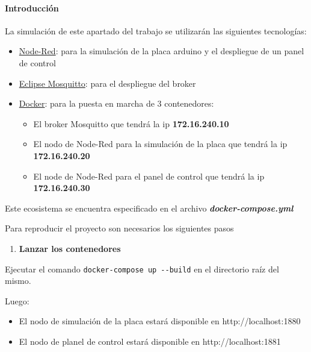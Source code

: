 \documentclass[11pt]{article}
\providecommand{\tightlist}{%
      \setlength{\itemsep}{0pt}\setlength{\parskip}{0pt}}
\begin{document}
    \hypertarget{introducciuxf3n}{%
\paragraph{Introducción}\label{introducciuxf3n}}

La simulación de este apartado del trabajo se utilizarán las siguientes
tecnologías:

\begin{itemize}
\item
  \href{https://nodered.org/}{Node-Red}: para la simulación de la placa
  arduino y el despliegue de un panel de control
\item
  \href{https://mosquitto.org/}{Eclipse Mosquitto}: para el despliegue
  del broker
\item
  \href{https://www.docker.com/}{Docker}: para la puesta en marcha de 3
  contenedores:

  \begin{itemize}
  \item
    El broker Mosquitto que tendrá la ip \textbf{172.16.240.10}
  \item
    El nodo de Node-Red para la simulación de la placa que tendrá la ip
    \textbf{172.16.240.20}
  \item
    El node de Node-Red para el panel de control que tendrá la ip
    \textbf{172.16.240.30}
  \end{itemize}
\end{itemize}

Este ecosistema se encuentra especificado en el archivo
\textbf{\emph{docker-compose.yml}}

Para reproducir el proyecto son necesarios los siguientes pasos

\begin{enumerate}
\def\labelenumi{\arabic{enumi})}
\tightlist
\item
  \textbf{Lanzar los contenedores}
\end{enumerate}

Ejecutar el comando \texttt{docker-compose\ up\ -\/-build} en el
directorio raíz del mismo.

Luego:

\begin{itemize}
\item
  El nodo de simulación de la placa estará disponible en
  http://localhost:1880
\item
  El nodo de planel de control estará disponible en
  http://localhost:1881
\end{itemize}
\end{document}
